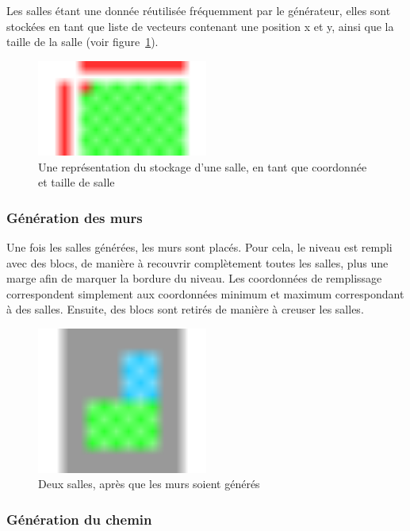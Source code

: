 \documentclass[10pt]{report}
\begin{document}
Les salles étant une donnée réutilisée fréquemment par le générateur,
elles sont stockées en tant que liste de vecteurs contenant une position
x et y, ainsi que la taille de la salle (voir figure~\ref{fig:room_data}).

\begin{figure}[H]
  \centering
  \includegraphics[width=0.5\textwidth]{images/room_storage.png}
  \caption{Une représentation du stockage d'une salle, 
  en tant que coordonnée et taille de salle}
  \label{fig:room_data}
\end{figure}

\subsubsection{Génération des murs}

Une fois les salles générées, les murs sont placés. Pour cela, le niveau 
est rempli avec des blocs, de manière à recouvrir complètement toutes
les salles, plus une marge afin de marquer la bordure du niveau. 
Les coordonnées de remplissage correspondent simplement aux coordonnées
minimum et maximum correspondant à des salles.
Ensuite, des blocs sont retirés de manière à creuser les salles.

\begin{figure}[H]
  \centering
  \includegraphics[width=0.5\textwidth]{images/filling_the_world.png}
  \caption{Deux salles, après que les murs soient générés}
  \label{fig:filling_world}
\end{figure}

\subsubsection{Génération du chemin}
\end{document}
